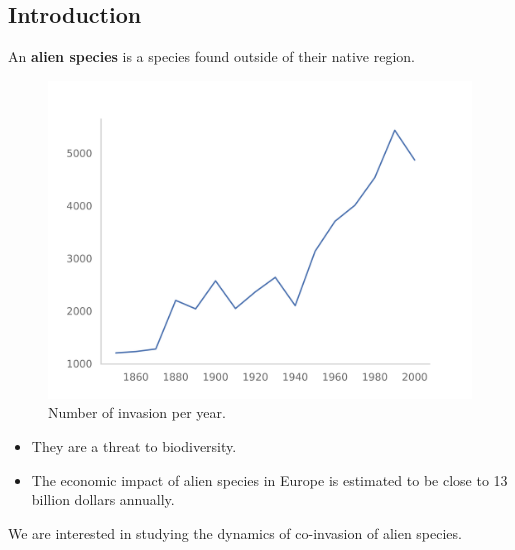 \documentclass[
	11pt, %
]{beamer}
\begin{document}

\subsection{Introduction}
\begin{frame}

	An \textbf{alien species} is a species found outside of their native region.
	
\end{frame}

\begin{frame}
\begin{figure}
		\includegraphics[width=0.8\linewidth]{invasion_per_year}
		\caption{Number of invasion per year.}
\end{figure}
\end{frame}

\begin{frame}
	
	\begin{itemize}
	\item 	They are a threat to biodiversity.
	\item 	The economic impact of alien species in Europe is estimated to be close to 13 billion dollars annually.	
	\end{itemize}		
\end{frame}

\begin{frame}
	We are interested in studying the dynamics of co-invasion of alien species.	
\end{frame}
\end{document}
